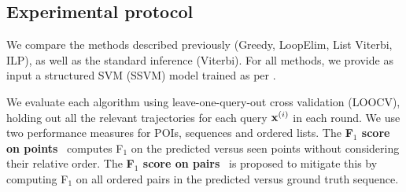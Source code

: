 \begin{table}[t]
		\label{tab:data}
	\vspace{-1.5\baselineskip}
\end{table}

%
\subsection{Experimental protocol}

We compare the methods described previously ({\sc Greedy}, {\sc LoopElim}, {\sc List Viterbi}, {\sc ILP}),
as well as the standard inference ({\sc Viterbi}).
For all methods, we provide as input a structured SVM (SSVM) model trained as per \citet{Chen:2017}.

We evaluate each algorithm using leave-one-query-out cross validation (LOOCV),
\ie holding out all the relevant trajectories for each query $\mathbf{x}^{(i)}$ in each round.
We use two performance measures for POIs, sequences and ordered lists.
The {\bf F$_1$ score on points}~\cite{ijcai15} computes F$_1$ on the predicted versus seen points
without considering their relative order.
The {\bf F$_1$ score on pairs}~\cite{cikm16paper} is proposed to mitigate this by computing F$_1$ on all ordered pairs in the predicted versus ground truth sequence. %


